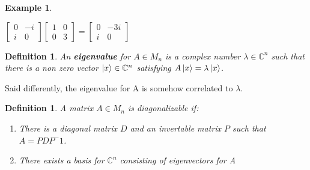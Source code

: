 \documentclass[12pt]{article}
\theoremstyle{plain}
\theoremstyle{nonumberplain}
\theoremstyle{plain}
\newtheorem{definition}[lemma]{Definition}
\newtheorem{example}[lemma]{Example}
\theoremstyle{nonumberplain}
\newcommand\1{{\bf 1}}
\newcommand{\bmat}[1]{\begin{bmatrix*} #1 \end{bmatrix*}} %
\newcommand{\C}{\mathbb{C}} %
\newcommand{\<}{\left\langle}
\renewcommand{\>}{\right\rangle}
\begin{document}
\begin{example}
\begin{center}
$\bmat{0 & -i \\ i & 0}\bmat{1 & 0 \\ 0 & 3}=\bmat{0 & -3i \\ i & 0}$
\end{center}
\end{example}
\begin{definition}
An \textbf{eigenvalue} for $A\in M_n$ is a complex number $\lambda\in\C^n$ such that there is a non zero vector $\ket{x}\in\C^n$ satisfying $A\ket{x}=\lambda\ket{x}$.
\end{definition}
Said differently, the eigenvalue for A is somehow correlated to $\lambda$.
\begin{definition}
A matrix $A\in M_n$ is diagonalizable if:
\begin{enumerate}
\item There is a diagonal matrix $D$ and an invertable  matrix $P$ such that $A=PDP^-1$.
\item There exists a basis for $\C^n$ consisting of eigenvectors for A
\end{enumerate}
\end{definition}
\end{document}
